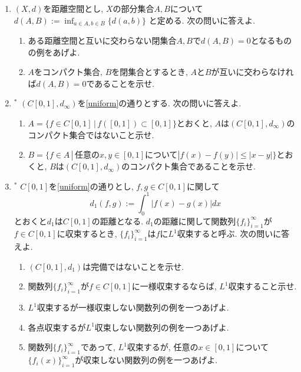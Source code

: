 \documentclass[dvipdfmx,a4paper,11pt]{article}
\theoremstyle{definition}
\begin{document}
\begin{enumerate}[label=\textbf{問}10.\arabic*]
\item $(X,d)$を距離空間とし, $X$の部分集合$A,B$について
$d(A,B) := \inf_{a \in A, b \in B} \{ d(a,b)\}$
と定める. 次の問いに答えよ.
\begin{enumerate}
 \setlength{\parskip}{0cm}
  \setlength{\itemsep}{2pt} 
	\item ある距離空間と互いに交わらない閉集合$A,B$で$d(A,B) =0$となるものの例をあげよ.
	\item $A$をコンパクト集合, $B$を閉集合とするとき, $A$と$B$が互いに交わらなければ$d(A,B)=0$であることを示せ.
\end{enumerate}


\item $^{*}$ $(C[0,1], d_{\infty})$を\ref{uniform}の通りとする. 次の問いに答えよ.
\begin{enumerate}
\setlength{\parskip}{0cm}
  \setlength{\itemsep}{2pt} 
\item $A=\{ f \in C[0,1] \,|\, f([0,1]) \subset [0,1] \}$とおくと, $A$は$(C[0,1], d_{\infty})$のコンパクト集合ではないこと示せ.
\item $B=\{ f \in A \,|\, \text{任意の$x,y \in [0,1]$について}|f(x)-f(y)| \le |x-y| \}$とおくと, $B$は$(C[0,1], d_{\infty})$のコンパクト集合であることを示せ.%
\end{enumerate}


\item $^{*}$ $C[0,1]$を\ref{uniform}の通りとし, $f,g \in C[0,1]$に関して
$$
d_1(f,g) := \int_{0}^{1} |f(x) - g(x)| dx
$$
とおくと$d_1$は$C[0,1]$の距離となる. $d_1$の距離に関して関数列$\{ f_{i}\}_{i=1}^{\infty}$が$f \in C[0,1]$に収束するとき, $\{ f_{i}\}_{i=1}^{\infty}$は$f$に$L^1$収束すると呼ぶ. 次の問いに答えよ.
\begin{enumerate}
\setlength{\parskip}{0cm}
  \setlength{\itemsep}{2pt} 
\item $(C[0,1], d_1)$は完備ではないことを示せ.
\item 関数列$\{ f_{i}\}_{i=1}^{\infty}$が$f \in C[0,1]$に一様収束するならば, $L^1$収束すること示せ. 
\item $L^1$収束するが一様収束しない関数列の例を一つあげよ.
\item 各点収束するが$L^1$収束しない関数列の例を一つあげよ.
\item 関数列$\{ f_{i}\}_{i=1}^{\infty}$であって, $L^1$収束するが, 任意の$x \in [0,1]$について$\{f_{i}(x)\}_{i=1}^{\infty}$が収束しない関数列の例を一つあげよ.
\end{enumerate}


\end{enumerate}
\end{document}
